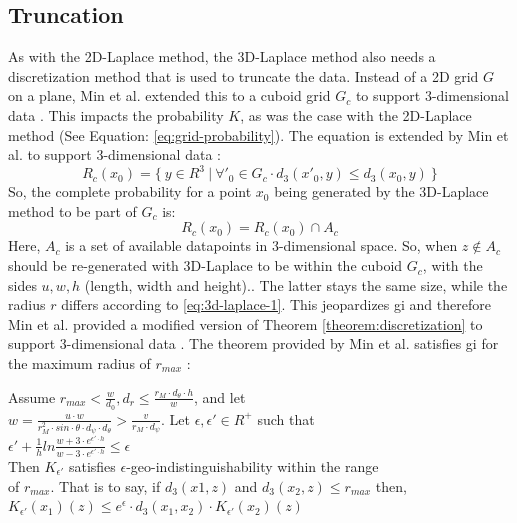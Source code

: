 \newpage
\subsection{Truncation}
As with the 2D-Laplace method, the 3D-Laplace method also needs a discretization method that is used to truncate the data.
Instead of a 2D grid $G$ on a plane, Min et al. extended this to a cuboid grid $G_c$ to support 3-dimensional data \citep{9646489}.
This impacts the probability $K$, as was the case with the 2D-Laplace method (See Equation: \ref{eq:grid-probability}).
The equation is extended by Min et al. to support 3-dimensional data \citep{9646489}:
\begin{equation}
  R_c(x_0) = \{ \ y \in R^3 \ | \ \forall'_{0} \in G_c \cdot d_3(x'_{0}, y) \leq d_3(x_0, y) \ \}
  \label{eq:3d-grid-probability}
\end{equation}
So, the complete probability for a point $x_0$ being generated by the 3D-Laplace method to be part of $G_c$ is:
\begin{equation}
  R_c(x_0) = R_c(x_0) \cap A_c
  \label{eq:3d-grid-probability-2}
\end{equation}
Here, $A_c$ is a set of available datapoints in 3-dimensional space. So, when $z \notin A_c$ should be re-generated with 3D-Laplace to be within the cuboid $G_c$, with the sides $u, w, h$ (length, width and height).. 
The latter stays the same size, while the radius $r$ differs according to \ref{eq:3d-laplace-1}.
This jeopardizes \gls{gi} and therefore Min et al. provided a modified version of Theorem \ref{theorem:discretization} to support 3-dimensional data \citep{9646489}.
The theorem provided by Min et al. satisfies \gls{gi} for the maximum radius of $r_{max}$ \citep{9646489}:
\begin{theorem}
  Assume $r_{max} < \frac{w}{d_0}, d_r \leq \frac{r_M \cdot d_\theta \cdot h}{w}$, and let \\
  $w = \frac{u \cdot w}{r^2_M \cdot sin \cdot \theta \cdot d_\psi \cdot d_\theta} > \frac{v}{r_M \cdot d_\psi}$. Let $\epsilon, \epsilon' \in R^+$ such that \\
  $\epsilon' + \frac{1}{h} ln \frac{w + 3 \cdot e^{\epsilon' \cdot h}}{w - 3 \cdot e^{\epsilon' \cdot h}} \leq \epsilon$ \\
  Then $K_{\epsilon'}$ satisfies $\epsilon$-geo-indistinguishability within the range \\
  of $r_{max}$. That is to say, if $d_3(x1, z)$ and $d_3(x_2, z) \leq r_{max}$ then, \\
  $K_{\epsilon'}(x_1)(z) \leq e^\epsilon \cdot d_3(x_1, x_2) \cdot K_{\epsilon'}(x_2)(z)$
  \label{theorem:3d-discretization}
\end{theorem}
